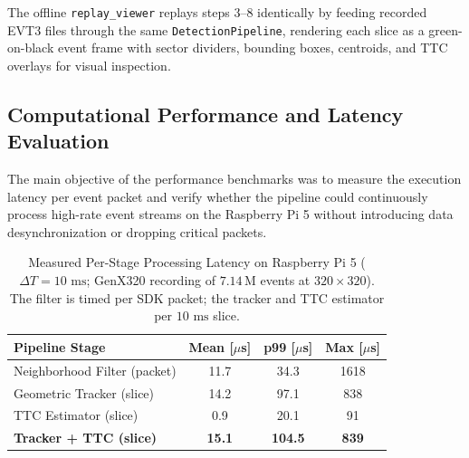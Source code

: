 \documentclass[conference]{IEEEtran}
\begin{document}
The offline \texttt{replay\_viewer} replays steps 3--8 identically by feeding recorded EVT3 files through the same \texttt{DetectionPipeline}, rendering each slice as a green-on-black event frame with sector dividers, bounding boxes, centroids, and TTC overlays for visual inspection.

\subsection{Computational Performance and Latency Evaluation}
The main objective of the performance benchmarks was to measure the execution latency per event packet and verify whether the pipeline could continuously process high-rate event streams on the Raspberry Pi 5 without introducing data desynchronization or dropping critical packets.

\begin{table}[htbp]
\caption{Measured Per-Stage Processing Latency on Raspberry Pi 5 ($\Delta T = 10\text{ ms}$; GenX320 recording of $7.14$\,M events at $320\times320$). The filter is timed per SDK packet; the tracker and TTC estimator per $10\text{ ms}$ slice.}
\begin{center}
\begin{tabular}{|l|c|c|c|}
\hline
\textbf{Pipeline Stage} & \textbf{Mean [$\mu$s]} & \textbf{p99 [$\mu$s]} & \textbf{Max [$\mu$s]} \\
\hline
Neighborhood Filter (packet) & 11.7 & 34.3 & 1618 \\
Geometric Tracker (slice)    & 14.2 & 97.1 & 838 \\
TTC Estimator (slice)        & 0.9  & 20.1 & 91 \\
\hline
\textbf{Tracker + TTC (slice)} & \textbf{15.1} & \textbf{104.5} & \textbf{839} \\
\hline
\end{tabular}
\label{tab:latency}
\end{center}
\end{table}
\end{document}

